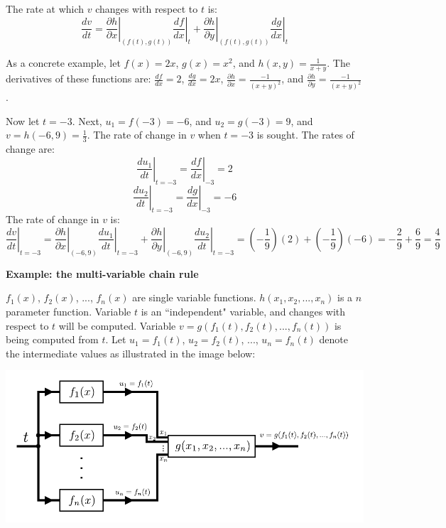 \documentclass{article}
\begin{document}
The rate at which \(v\) changes with respect to \(t\) is:
\[\frac{dv}{dt} = \left.\frac{\partial h}{\partial x}\right|_{(f(t),g(t))} \left.\frac{df}{dx}\right|_t + \left.\frac{\partial h}{\partial y}\right|_{(f(t),g(t))} \left.\frac{dg}{dx}\right|_t\]

As a concrete example, let \(f(x) = 2x\), \(g(x) = x^2\), and \(h(x, y) = \frac{1}{x + y}\). The derivatives of these functions are: \(\frac{df}{dx} = 2\), \(\frac{dg}{dx} = 2x\), \(\frac{\partial h}{\partial x} = \frac{-1}{(x + y)^2}\), and \(\frac{\partial h}{\partial y} = \frac{-1}{(x + y)^2}\). 

Now let \(t = -3\). Next, \(u_1 = f(-3) = -6\), and \(u_2 = g(-3) = 9\), and \(v = h(-6, 9) = \frac{1}{3}\). The rate of change in \(v\) when \(t = -3\) is sought. The rates of change are:
\[\left.\frac{du_1}{dt}\right|_{t = -3} = \left.\frac{df}{dx}\right|_{-3} = 2\]
\[\left.\frac{du_2}{dt}\right|_{t = -3} = \left.\frac{dg}{dx}\right|_{-3} = -6\] 
The rate of change in \(v\) is: 
\[\left.\frac{dv}{dt}\right|_{t = -3} = \left.\frac{\partial h}{\partial x}\right|_{(-6, 9)} \left.\frac{du_1}{dt}\right|_{t = -3} + \left.\frac{\partial h}{\partial y}\right|_{(-6,9)} \left.\frac{du_2}{dt}\right|_{t = -3} = (-\frac{1}{9})(2) + (-\frac{1}{9})(-6) = -\frac{2}{9} + \frac{6}{9} = \frac{4}{9}\]   




\vspace{5mm}

\textbf{Example: the multi-variable chain rule}

\(f_1(x)\), \(f_2(x)\), ..., \(f_n(x)\) are single variable functions. \(h(x_1, x_2, ..., x_n)\) is a \(n\) parameter function. Variable \(t\) is an ``independent" variable, and changes with respect to \(t\) will be computed. Variable \(v = g(f_1(t), f_2(t), ..., f_n(t))\) is being computed from \(t\). Let \(u_1 = f_1(t)\), \(u_2 = f_2(t)\), ..., \(u_n = f_n(t)\) denote the intermediate values as illustrated in the image below:  

\begin{center}
\includegraphics[scale = 1.0]{multi_variable_chain_rule}
\end{center}
\end{document}
